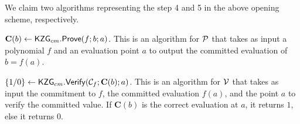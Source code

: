 We claim two algorithms representing the step 4 and 5 in the above opening scheme, respectively.
\begin{claim}
$\textbf{C}(b)\leftarrow\mathsf{KZG}_{cm}.\mathsf{Prove}(f;b;a)$. This is an algorithm for $\mathcal{P}$ that takes as input a polynomial $f$ and an evaluation point $a$ to output the committed evaluation of $b=f(a)$.
\end{claim}

\begin{claim}
$\{1/0\}\leftarrow\mathsf{KZG}_{cm}.\mathsf{Verify}(\mathcal{C}_f;\textbf{C}(b);a)$. This is an algorithm for $\mathcal{V}$ that takes as input the commitment to $f$, the committed evaluation $f(a)$, and the point $a$ to verify the committed value. If $\textbf{C}(b)$ is the correct evaluation at $a$, it returns $1$, else it returns $0$.
\end{claim}
